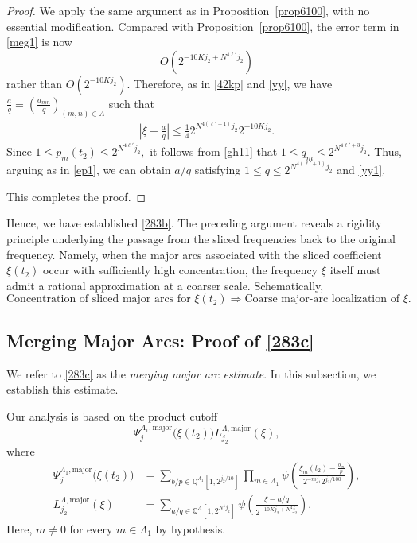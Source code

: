 \documentclass[11 pt,letterpaper]{amsart}
\theoremstyle{plain}
\theoremstyle{definition}
\theoremstyle{remark} \theoremstyle{exam} \theoremstyle{ob}
\numberwithin{equation}{section}
\begin{document}
\begin{proof}
We apply the same argument as in Proposition~\ref{prop6100}, with no essential modification. Compared with Proposition~\ref{prop6100}, the error term in \eqref{meg1} is now \[ O\!\left(2^{-10K j_2 + N^{4\ell'} j_2}\right) \]
rather than $O(2^{-10Kj_2})$. Therefore, as in \eqref{42kp} and \eqref{yy}, we have $\frac{a}{q}
=
\left( \frac{a_{mn}}{q} \right)_{(m,n)\in \Lambda}$ such that
\begin{align}\label{yy1}
	\left|\xi-\frac{a}{q}\right|
	\le \frac{1}{4}
	2^{N^{4(\ell'+1)}j_2}2^{-10Kj_2}.
\end{align}
Since
$
1\le p_m(t_2)\le 2^{N^{4\ell'}j_2},
$
it follows from \eqref{gh11} that
$
1\le q_m\le 2^{N^{4\ell'+3}j_2}.
$
Thus, arguing as in \eqref{ep1}, we can obtain $a/q$ satisfying 
$
1\le q\le 2^{N^{4(\ell'+1)}j_2}
$ and \eqref{yy1}.

This completes the proof.

\end{proof}
Hence, we have established \eqref{283b}. The preceding argument reveals a rigidity principle underlying the passage from the sliced frequencies back to the original frequency. Namely, when the major arcs associated with the sliced coefficient $\xi(t_2)$ occur with sufficiently high concentration, the frequency $\xi$ itself must admit a rational approximation at a coarser scale. Schematically, $$
\text{Concentration of sliced major arcs for $\xi(t_2)$}
\Longrightarrow
\text{Coarse major-arc localization of $\xi$.}
$$


 

\subsection{Merging Major Arcs: Proof of \eqref{283c}}\label{Sec5.4}
We refer to \eqref{283c} as the \emph{merging major arc estimate}. In this subsection, we establish this estimate.

Our analysis is based on the product cutoff
\[
\Psi^{\Lambda_1,\mathrm{major}}_{j}\bigl(\xi(t_2)\bigr)
L^{\Lambda,\mathrm{major}}_{j_2}(\xi),
\]
where
\begin{align}
\Psi^{\Lambda_1,\mathrm{major}}_{j}\bigl(\xi(t_2)\bigr)
&=
\sum_{b/p\in\mathbb{Q}^{\Lambda_1}[1,2^{j_2/10}]}
\prod_{m\in\Lambda_1}
\psi\!\left(
\frac{\xi_m(t_2)-\frac{b_m}{p}}
{2^{-mj_1}2^{j_2/100}}
\right),\label{put3}\\
L^{\Lambda,\mathrm{major}}_{j_2}(\xi)
&=
\sum_{a/q\in\mathbb{Q}^{\Lambda}[1,2^{N^4j_2}]}
\psi\!\left(
\frac{\xi-a/q}
{2^{-10Kj_2+N^4j_2}}
\right).\nonumber
\end{align} 
Here, $m\neq0$ for every $m\in\Lambda_1$ by hypothesis.
 
\end{document}
